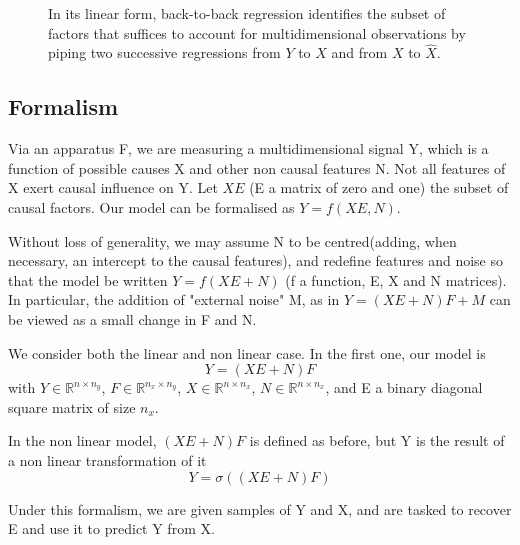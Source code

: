 \documentclass{article}
\begin{document}
\begin{figure}[t!]
    \caption{In its linear form, back-to-back regression identifies the subset of factors that suffices to account for multidimensional observations by piping two successive regressions from $Y$ to $X$ and from $X$ to $\hat X$. }
    \label{fig:}
\end{figure}

\subsection{Formalism}
Via an apparatus F, we are measuring a multidimensional signal Y, which is a function of possible causes X and other non causal features N. Not all features of X exert causal influence on Y. Let $XE$ (E a matrix of zero and one) the subset of causal factors. Our model can be formalised as $Y=f(XE,N)$. 

Without loss of generality, we may assume N to be centred(adding, when necessary, an intercept to the causal features), and redefine features and noise so that the model be written $Y=f(XE+N)$ (f a function, E, X and N matrices). In particular, the addition of "external noise" M, as in $Y=(XE+N)F+M$ can be viewed as a small change in F and N.

We consider both the linear and non linear case. In the first one, our model is $$Y = (XE+N)F$$with  $Y\in\mathbb{R}^{n\times n_{y}}$, $F\in\mathbb{R}^{n_{x}\times n_{y}}$, $X\in\mathbb{R}^{n\times n_{x}}$, $N\in\mathbb{R}^{n\times n_{x}}$, and E a binary diagonal square matrix of size $n_{x}$. 

In the non linear model, $(XE+N)F$ is defined as before, but Y is the result of a non linear transformation of it $$Y=\sigma ((XE+N)F)$$

Under this formalism, we are given samples of Y and X, and are tasked to recover E and use it to predict Y from X.
\end{document}
